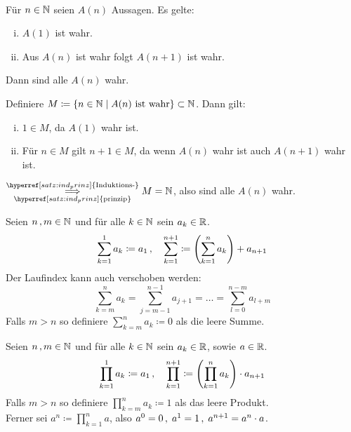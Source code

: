 \documentclass[../ana1.tex]{subfiles}
\begin{document}
\begin{kor}\label{satz:vollst_ind}\leavevmode \\
	Für \(n \in \mathbb{N} \) seien \(A(n) \) Aussagen. Es gelte:
	\begin{enumerate}[(i)]
		\item \(A(1) \) ist wahr.
		\item Aus \(A(n) \) ist wahr folgt \(A(n+1) \) ist wahr.
	\end{enumerate}
	Dann sind alle \(A(n) \) wahr.
\end{kor}
\begin{bew}
	Definiere \(M \coloneqq \{n \in \mathbb{N}  \; \vert  \; A(n) \text{ ist wahr}\} \subset \mathbb{N} \). Dann gilt:
	\begin{enumerate}[(i)]
		\item \(1\in M \), da \(A(1) \) wahr ist.
		\item Für \(n\in M \) gilt \(n + 1 \in M \), da wenn \(A(n) \) wahr ist auch \(A(n + 1) \) wahr ist.
	\end{enumerate}
	\(\overunderset{\hyperref[satz:ind_prinz]{\text{Induktions-}}}{\hyperref[satz:ind_prinz]{\text{prinzip}}}{\implies} M = \N \), also sind alle \(A(n) \) wahr.
\end{bew}

\begin{defi*}[Summen]Seien \(n \operatorname{,} m \in \mathbb{N} \) und für alle \(k \in \mathbb{N} \) sein \(a_{k} \in \mathbb{R} \).
	\[\sum_{k = 1}^{1} a_{k} \coloneqq a_{1} \operatorname{,} \quad \sum_{k = 1}^{n + 1} \coloneqq \left(\sum_{k = 1}^{n} a_{k} \right) + a_{n + 1} \]
	Der Laufindex kann auch verschoben werden:
	\[\sum_{k = m}^{n} a_{k} = \sum_{j = m - 1}^{n - 1} a_{j + 1} = \ldots = \sum_{l = 0}^{n - m} a_{l + m} \]
	Falls \(m > n \) so definiere \(\sum_{k = m}^{n} a_{k} \coloneqq 0 \) als die leere Summe.
\end{defi*}

\begin{defi*}[Produkte]Seien \(n \operatorname{,} m \in \mathbb{N} \) und für alle \(k \in \mathbb{N} \) sein \(a_{k} \in \mathbb{R} \), sowie \(a \in \mathbb{R} \).
	\[\prod_{k = 1}^{1} a_{k} \coloneqq a_{1} \operatorname{,} \quad \prod_{k = 1}^{n + 1} \coloneqq \left(\prod_{k = 1}^{n} a_{k} \right) \cdot a_{n + 1} \]
	Falls \(m > n \) so definiere \(\prod_{k = m}^{n} a_{k} \coloneqq 1 \) als das leere Produkt. \\
	Ferner sei \(a^{n} \coloneqq \prod_{k = 1}^{n} a \), also \(a^{0} = 0 \operatorname{,}  \; a^{1} = 1 \operatorname{,}  \; a^{n + 1} = a^{n} \cdot a \).
\end{defi*}
\end{document}
